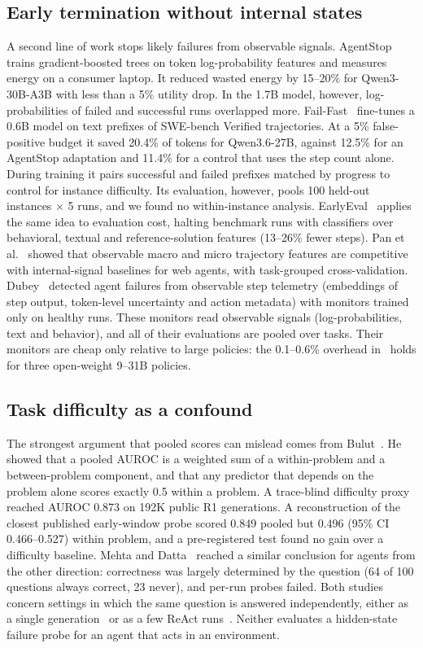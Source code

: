 \documentclass[11pt]{article}
\begin{document}
\subsection{Early termination without internal states}
A second line of work stops likely failures from observable signals. AgentStop~\cite{pham2026agentstop} trains gradient-boosted trees on token log-probability features and measures energy on a consumer laptop.
It reduced wasted energy by 15--20\% for Qwen3-30B-A3B with less than a 5\% utility drop. In the 1.7B model, however, log-probabilities of failed and successful runs overlapped more.
Fail-Fast~\cite{wang2026failfast} fine-tunes a 0.6B model on text prefixes of SWE-bench Verified trajectories. At a 5\% false-positive budget it saved 20.4\% of tokens for Qwen3.6-27B, against 12.5\% for an AgentStop adaptation and 11.4\% for a control that uses the step count alone.
During training it pairs successful and failed prefixes matched by progress to control for instance difficulty. Its evaluation, however, pools 100 held-out instances $\times$ 5 runs, and we found no within-instance analysis.
EarlyEval~\cite{shi2026earlyeval} applies the same idea to evaluation cost, halting benchmark runs with classifiers over behavioral, textual and reference-solution features (13--26\% fewer steps).
Pan et al.~\cite{pan2026monitoring} showed that observable macro and micro trajectory features are competitive with internal-signal baselines for web agents, with task-grouped cross-validation. Dubey~\cite{dubey2026realtime} detected agent failures from observable step telemetry (embeddings of step output, token-level uncertainty and action metadata) with monitors trained only on healthy runs.
These monitors read observable signals (log-probabilities, text and behavior), and all of their evaluations are pooled over tasks. Their monitors are cheap only relative to large policies: the 0.1--0.6\% overhead in~\cite{wang2026failfast} holds for three open-weight 9--31B policies.

\subsection{Task difficulty as a confound}
The strongest argument that pooled scores can mislead comes from Bulut~\cite{bulut2026problem}. He showed that a pooled AUROC is a weighted sum of a within-problem and a between-problem component, and that any predictor that depends on the problem alone scores exactly 0.5 within a problem.
A trace-blind difficulty proxy reached AUROC 0.873 on 192K public R1 generations. A reconstruction of the closest published early-window probe scored 0.849 pooled but 0.496 (95\% CI 0.466--0.527) within problem, and a pre-registered test found no gain over a difficulty baseline.
Mehta and Datta~\cite{mehta2026commit} reached a similar conclusion for agents from the other direction: correctness was largely determined by the question (64 of 100 questions always correct, 23 never), and per-run probes failed.
Both studies concern settings in which the same question is answered independently, either as a single generation~\cite{bulut2026problem} or as a few ReAct runs~\cite{mehta2026commit}. Neither evaluates a hidden-state failure probe for an agent that acts in an environment.
\end{document}
